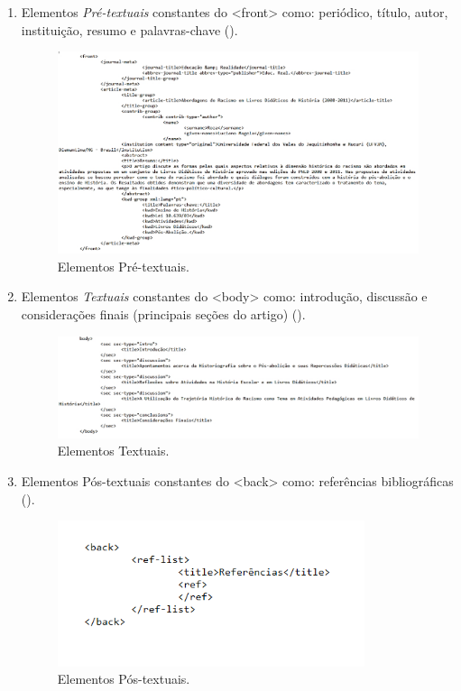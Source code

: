 \documentclass[portuguese]{textolivre}
\begin{document}
\begin{enumerate}
    \item Elementos \textit{Pré-textuais} constantes do <front> como: periódico, título, autor, instituição, resumo e palavras-chave ().
\begin{figure}[htbp]
 \centering
 \includegraphics[width=\textwidth]{Fig14.png}
 \caption{Elementos Pré-textuais.}
 \label{fig-14}
\end{figure}
    \item Elementos \textit{Textuais} constantes do <body> como: introdução, discussão e considerações finais (principais seções do artigo) ().
\begin{figure}[htbp]
\centering
\includegraphics[width=\textwidth]{Fig15.png}
\caption{Elementos Textuais.}
\label{fig-15}
\end{figure}
    \item Elementos Pós-textuais constantes do <back> como: referências bibliográficas ().
\begin{figure}[htbp]
\centering
\includegraphics[width=0.85\textwidth]{Fig16.png}
\caption{Elementos Pós-textuais.}
\label{fig-16}
\end{figure}
\end{enumerate}
\end{document}
